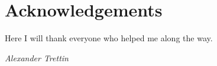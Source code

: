 \chapter*{Acknowledgements}

Here I will thank everyone who helped me along the way.

\begin{flushright}
	\textit{Alexander Trettin}
\end{flushright}